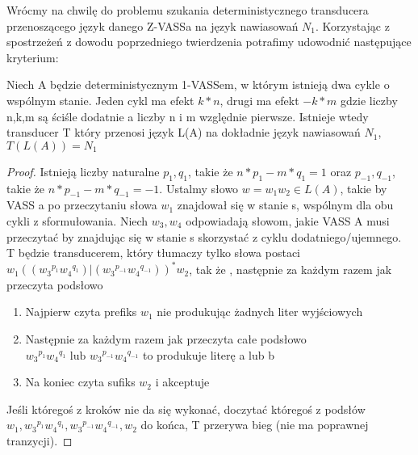     Wrócmy na chwilę do problemu szukania deterministycznego transducera przenoszącego język danego Z-VASSa na język nawiasowań $N_1$.
    Korzystając z spostrzeżeń z dowodu poprzedniego twierdzenia potrafimy udowodnić następujące kryterium:
    \begin{lemma}
        Niech A będzie deterministycznym 1-VASSem, w którym istnieją dwa cykle o wspólnym stanie.
        Jeden cykl ma efekt $k*n$, drugi ma efekt  $-k*m$ gdzie liczby n,k,m są ściśle dodatnie a liczby n i m względnie pierwsze.
        Istnieje wtedy transducer T który przenosi język L(A) na dokładnie język nawiasowań $N_1$, $T(L(A)) = N_1$
    \end{lemma}
    \begin{proof}
        Istnieją liczby naturalne  $p_1,q_1$, takie że  $n*p_1 - m*q_1 = 1$ oraz $p_{-1},q_{-1}$, takie że  $n*p_{-1} - m*q_{-1} = -1$.
        Ustalmy słowo $w=w_1 w_2 \in L(A)$, takie by VASS a po przeczytaniu słowa $w_1$ znajdował się w stanie s, wspólnym dla obu cykli
        z sformułowania.
        Niech $w_3,w_4$ odpowiadają słowom, jakie VASS A musi przeczytać by znajdując się w stanie s skorzystać z cyklu dodatniego/ujemnego.
        T będzie transducerem, który tłumaczy tylko słowa postaci $w_1 (({w_3}^{p_1} {w_4}^{q_1}) | ({w_3}^{p_{-1}} {w_4}^{q_{-1}}))^* w_2$,
        tak że , następnie za każdym razem jak przeczyta podsłowo
        \begin{enumerate}
            \item Najpierw czyta prefiks $w_1$ nie produkując żadnych liter wyjściowych
            \item Następnie za każdym razem jak przeczyta całe podsłowo ${w_3}^{p_1} {w_4}^{q_1} \text{ lub }  {w_3}^{p_{-1}} {w_4}^{q_{-1}}$ to produkuje literę a lub b
            \item Na koniec czyta sufiks $w_2$ i akceptuje
        \end{enumerate}
        Jeśli któregoś z kroków nie da się wykonać, doczytać któregoś z podsłów $w_1,{w_3}^{p_1} {w_4}^{q_1},{w_3}^{p_{-1}} {w_4}^{q_{-1}},w_2$ do końca, T przerywa bieg (nie ma poprawnej tranzycji).


    \end{proof}

%
%

